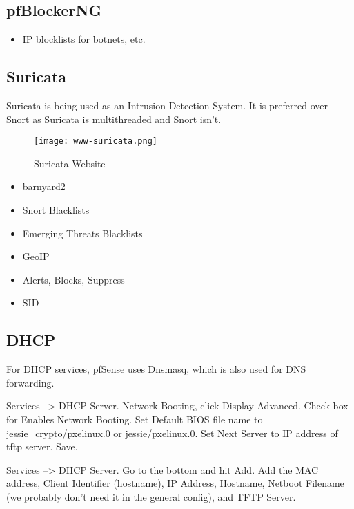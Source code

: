 \subsection{pfBlockerNG}
\begin{itemize}
 \item IP blocklists for botnets, etc.
\end{itemize}


\subsection{Suricata}
Suricata is being used as an Intrusion Detection System.
It is preferred over Snort as Suricata is multithreaded and Snort isn't.

\begin{figure}[h!]
\texttt{[image: www-suricata.png]}
 \caption{Suricata Website}
 \label{fig:www-suricata}
\end{figure}

\begin{itemize}
 \item barnyard2
 \item Snort Blacklists
 \item Emerging Threats Blacklists
 \item GeoIP
 \item Alerts, Blocks, Suppress
 \item SID
\end{itemize}


\subsection{DHCP}
For DHCP services, pfSense uses Dnsmasq, which is also used for DNS
forwarding.


\begin{ennumerate}
 \item Services --> DHCP Server. Network Booting, click Display Advanced. Check box for Enables Network Booting. Set Default BIOS file name to jessie\_crypto/pxelinux.0 or jessie/pxelinux.0. Set Next Server to IP address of tftp server. Save.
 \item Services --> DHCP Server. Go to the bottom and hit Add. Add the MAC address, Client Identifier (hostname), IP Address, Hostname, Netboot Filename (we probably don't need it in the general config), and TFTP Server.
\end{ennumerate}

